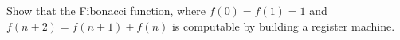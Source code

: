 \begin{problem}
  Show that the Fibonacci function, where $f(0) = f(1) = 1$
  and $f(n + 2) = f(n + 1) + f(n)$ is computable by building
  a register machine.

  \begin{answer}

  \end{answer}
\end{problem}
